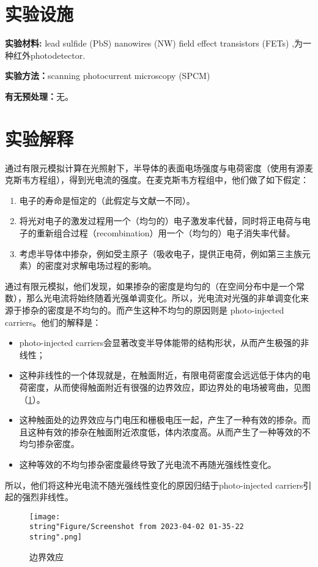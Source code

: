 \documentclass[english]{ctexart}
\begin{document}
\section{实验设施}

\textbf{实验材料:} lead sulfide (PbS) nanowires (NW) field effect transistors
(FETs) ,为一种红外photodetector.

\textbf{实验方法：}scanning photocurrent microscopy (SPCM)

\textbf{有无预处理：}无。

\section{实验解释}

通过有限元模拟计算在光照射下，半导体的表面电场强度与电荷密度（使用有源麦克斯韦方程组），得到光电流的强度。在麦克斯韦方程组中，他们做了如下假定：
\begin{enumerate}
\item 电子的寿命是恒定的（此假定与文献一不同）。
\item 将光对电子的激发过程用一个（均匀的）电子激发率代替，同时将正电荷与电子的重新组合过程（recombination）用一个（均匀的）电子消失率代替。
\item 考虑半导体中掺杂，例如受主原子（吸收电子，提供正电荷，例如第三主族元素）的密度对求解电场过程的影响。
\end{enumerate}
通过有限元模拟，他们发现，如果掺杂的密度是均匀的（在空间分布中是一个常数），那么光电流将始终随着光强单调变化。所以，光电流对光强的非单调变化来源于掺杂的密度是不均匀的。而产生这种不均匀的原因则是
photo-injected carriers。他们的解释是：
\begin{itemize}
\item photo-injected carriers会显著改变半导体能带的结构形状，从而产生极强的非线性；
\item 这种非线性的一个体现就是，在触面附近，有限电荷密度会远远低于体内的电荷密度，从而使得触面附近有很强的边界效应，即边界处的电场被弯曲，见图（\ref{fig4}）。
\item 这种触面处的边界效应与门电压和栅极电压一起，产生了一种有效的掺杂。而且这种有效的掺杂在触面附近浓度低，体内浓度高。从而产生了一种等效的不均匀掺杂密度。
\item 这种等效的不均匀掺杂密度最终导致了光电流不再随光强线性变化。
\end{itemize}
所以，他们将这种光电流不随光强线性变化的原因归结于photo-injected carriers引起的强烈非线性。

\begin{figure}
\texttt{[image: \\string"Figure/Screenshot from 2023-04-02 01-35-22\\string".png]}

\caption{边界效应}

\label{fig4}
\end{figure}
\end{document}
